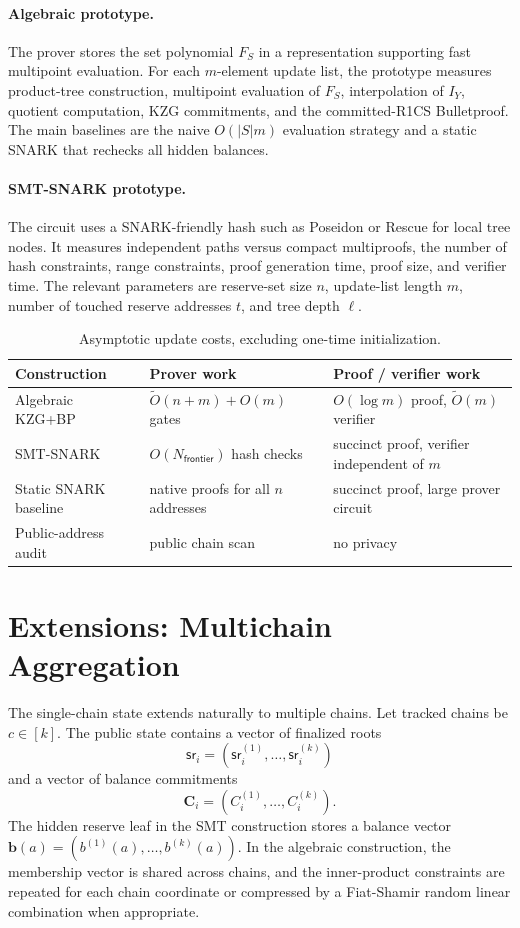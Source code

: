 \documentclass[runningheads]{llncs}
\newcommand{\sr}{\mathsf{sr}}
\newcommand{\softO}{\widetilde{O}}
\begin{document}
\paragraph{Algebraic prototype.}
The prover stores the set polynomial \(F_S\) in a representation supporting fast multipoint evaluation.  For each \(m\)-element update list, the prototype measures product-tree construction, multipoint evaluation of \(F_S\), interpolation of \(I_Y\), quotient computation, KZG commitments, and the committed-R1CS Bulletproof.  The main baselines are the naive \(O(|S|m)\) evaluation strategy and a static SNARK that rechecks all hidden balances.

\paragraph{SMT-SNARK prototype.}
The circuit uses a SNARK-friendly hash such as Poseidon or Rescue for local tree nodes.  It measures independent paths versus compact multiproofs, the number of hash constraints, range constraints, proof generation time, proof size, and verifier time.  The relevant parameters are reserve-set size \(n\), update-list length \(m\), number of touched reserve addresses \(t\), and tree depth \(\ell\).

\begin{table}[t]
\centering
\caption{Asymptotic update costs, excluding one-time initialization.}
\label{tab:costs}
\begin{tabular}{lll}
\toprule
Construction & Prover work & Proof / verifier work \\
\midrule
Algebraic KZG+BP & \(\softO(n+m)+O(m)\) gates & \(O(\log m)\) proof, \(\softO(m)\) verifier \\
SMT-SNARK & \(O(N_{\mathsf{frontier}})\) hash checks & succinct proof, verifier independent of \(m\) \\
Static SNARK baseline & native proofs for all \(n\) addresses & succinct proof, large prover circuit \\
Public-address audit & public chain scan & no privacy \\
\bottomrule
\end{tabular}
\end{table}

\section{Extensions: Multichain Aggregation}

The single-chain state extends naturally to multiple chains.  Let tracked chains be \(c\in[k]\).  The public state contains a vector of finalized roots
\[
        \boldsymbol{\sr}_i=(\sr_i^{(1)},\ldots,\sr_i^{(k)})
\]
and a vector of balance commitments
\[
        \mathbf C_i=(C_i^{(1)},\ldots,C_i^{(k)}).
\]
The hidden reserve leaf in the SMT construction stores a balance vector \(\mathbf b(a)=(b^{(1)}(a),\ldots,b^{(k)}(a))\).  In the algebraic construction, the membership vector is shared across chains, and the inner-product constraints are repeated for each chain coordinate or compressed by a Fiat-Shamir random linear combination when appropriate.
\end{document}
